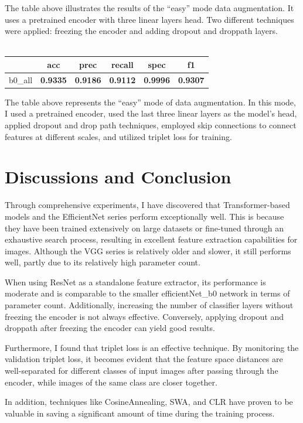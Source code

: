 \documentclass[10pt,twocolumn,letterpaper]{article}
\begin{document}
The table above illustrates the results of the ``easy'' mode data augmentation. It uses a pretrained encoder with three linear layers head. Two different techniques were applied: freezing the encoder and adding dropout and droppath layers.
~\\
~\\
\begin{tabularx}{\columnwidth}{lccccc}
	\toprule
	 & acc & prec & recall & spec & f1 \\
	\midrule
	b0\_all & \textbf{0.9335} & \textbf{0.9186} & \textbf{0.9112} & \textbf{0.9996} & \textbf{0.9307} \\
	\bottomrule
	\end{tabularx}	
	The table above represents the ``easy'' mode of data augmentation. In this mode, I used a pretrained encoder, used the last three linear layers as the model's head, applied dropout and drop path techniques, employed skip connections to connect features at different scales, and utilized triplet loss for training.
\section{Discussions and Conclusion}
\label{sec:discons}
Through comprehensive experiments, I have discovered that Transformer-based models and the EfficientNet series perform exceptionally well. This is because they have been trained extensively on large datasets or fine-tuned through an exhaustive search process, resulting in excellent feature extraction capabilities for images. Although the VGG series is relatively older and slower, it still performs well, partly due to its relatively high parameter count.

When using ResNet as a standalone feature extractor, its performance is moderate and is comparable to the smaller efficientNet\_b0 network in terms of parameter count. Additionally, increasing the number of classifier layers without freezing the encoder is not always effective. Conversely, applying dropout and droppath after freezing the encoder can yield good results.

Furthermore, I found that triplet loss is an effective technique. By monitoring the validation triplet loss, it becomes evident that the feature space distances are well-separated for different classes of input images after passing through the encoder, while images of the same class are closer together.

In addition, techniques like CosineAnnealing, SWA, and CLR have proven to be valuable in saving a significant amount of time during the training process.

	{\small
		
		
	}
\end{document}
